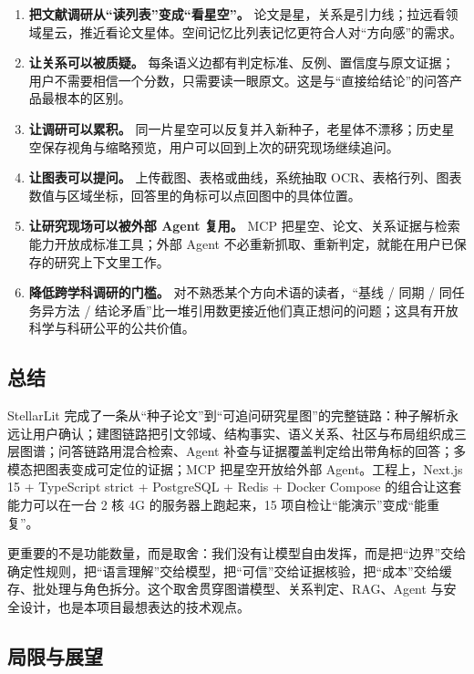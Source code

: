 \begin{enumerate}
  \item \textbf{把文献调研从“读列表”变成“看星空”。} 论文是星，关系是引力线；拉远看领域星云，推近看论文星体。空间记忆比列表记忆更符合人对“方向感”的需求。
  \item \textbf{让关系可以被质疑。} 每条语义边都有判定标准、反例、置信度与原文证据；用户不需要相信一个分数，只需要读一眼原文。这是与“直接给结论”的问答产品最根本的区别。
  \item \textbf{让调研可以累积。} 同一片星空可以反复并入新种子，老星体不漂移；历史星空保存视角与缩略预览，用户可以回到上次的研究现场继续追问。
  \item \textbf{让图表可以提问。} 上传截图、表格或曲线，系统抽取 OCR、表格行列、图表数值与区域坐标，回答里的角标可以点回图中的具体位置。
  \item \textbf{让研究现场可以被外部 Agent 复用。} MCP 把星空、论文、关系证据与检索能力开放成标准工具；外部 Agent 不必重新抓取、重新判定，就能在用户已保存的研究上下文里工作。
  \item \textbf{降低跨学科调研的门槛。} 对不熟悉某个方向术语的读者，“基线 / 同期 / 同任务异方法 / 结论矛盾”比一堆引用数更接近他们真正想问的问题；这具有开放科学与科研公平的公共价值。
\end{enumerate}

\subsection{总结}

StellarLit 完成了一条从“种子论文”到“可追问研究星图”的完整链路：种子解析永远让用户确认；建图链路把引文邻域、结构事实、语义关系、社区与布局组织成三层图谱；问答链路用混合检索、Agent 补查与证据覆盖判定给出带角标的回答；多模态把图表变成可定位的证据；MCP 把星空开放给外部 Agent。工程上，Next.js 15 + TypeScript strict + PostgreSQL + Redis + Docker Compose 的组合让这套能力可以在一台 2 核 4G 的服务器上跑起来，15 项自检让“能演示”变成“能重复”。

更重要的不是功能数量，而是取舍：我们没有让模型自由发挥，而是把“边界”交给确定性规则，把“语言理解”交给模型，把“可信”交给证据核验，把“成本”交给缓存、批处理与角色拆分。这个取舍贯穿图谱模型、关系判定、RAG、Agent 与安全设计，也是本项目最想表达的技术观点。

\subsection{局限与展望}

